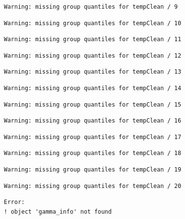 \documentclass[
]{article}
\begin{document}
\begin{verbatim}
Warning: missing group quantiles for tempClean / 9
\end{verbatim}

\begin{verbatim}
Warning: missing group quantiles for tempClean / 10
\end{verbatim}

\begin{verbatim}
Warning: missing group quantiles for tempClean / 11
\end{verbatim}

\begin{verbatim}
Warning: missing group quantiles for tempClean / 12
\end{verbatim}

\begin{verbatim}
Warning: missing group quantiles for tempClean / 13
\end{verbatim}

\begin{verbatim}
Warning: missing group quantiles for tempClean / 14
\end{verbatim}

\begin{verbatim}
Warning: missing group quantiles for tempClean / 15
\end{verbatim}

\begin{verbatim}
Warning: missing group quantiles for tempClean / 16
\end{verbatim}

\begin{verbatim}
Warning: missing group quantiles for tempClean / 17
\end{verbatim}

\begin{verbatim}
Warning: missing group quantiles for tempClean / 18
\end{verbatim}

\begin{verbatim}
Warning: missing group quantiles for tempClean / 19
\end{verbatim}

\begin{verbatim}
Warning: missing group quantiles for tempClean / 20
\end{verbatim}

\begin{verbatim}
Error:
! object 'gamma_info' not found
\end{verbatim}
\end{document}
